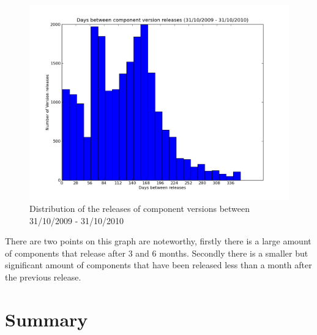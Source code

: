 \begin{figure}[htp]
\begin{center}
  \includegraphics[width=\textwidth]{ubuntusimulationpics/versionreleasedistribution}
  \caption[labelInTOC]{Distribution of the releases of component versions between 31/10/2009 - 31/10/2010}
  \label{comeponentversionreleases}
\end{center}
\end{figure}

There are two points on this graph are noteworthy, firstly there is a large amount of components that release after 3 and 6 months.
Secondly there is a smaller but significant amount of components that have been released less than a month after the previous release.


\section{Summary}
